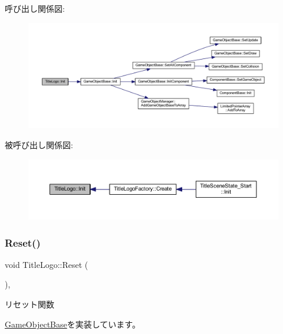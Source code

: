 呼び出し関係図\+:\nopagebreak
\begin{figure}[H]
\begin{center}
\leavevmode
\includegraphics[width=350pt]{class_title_logo_a1e07aae4771bd7a44cb7e3b55b72b9f3_cgraph}
\end{center}
\end{figure}
被呼び出し関係図\+:\nopagebreak
\begin{figure}[H]
\begin{center}
\leavevmode
\includegraphics[width=350pt]{class_title_logo_a1e07aae4771bd7a44cb7e3b55b72b9f3_icgraph}
\end{center}
\end{figure}
\mbox{\label{class_title_logo_a8bca39d06592b95b26024c2d86ac349c}} 
\subsubsection{\texorpdfstring{Reset()}{Reset()}}
{\footnotesize\ttfamily void Title\+Logo\+::\+Reset (\begin{DoxyParamCaption}{ }\end{DoxyParamCaption})\hspace{0.3cm}{\ttfamily [override]}, {\ttfamily [virtual]}}



リセット関数 



\mbox{\hyperlink{class_game_object_base_a85c59554f734bcb09f1a1e18d9517dce}{Game\+Object\+Base}}を実装しています。



